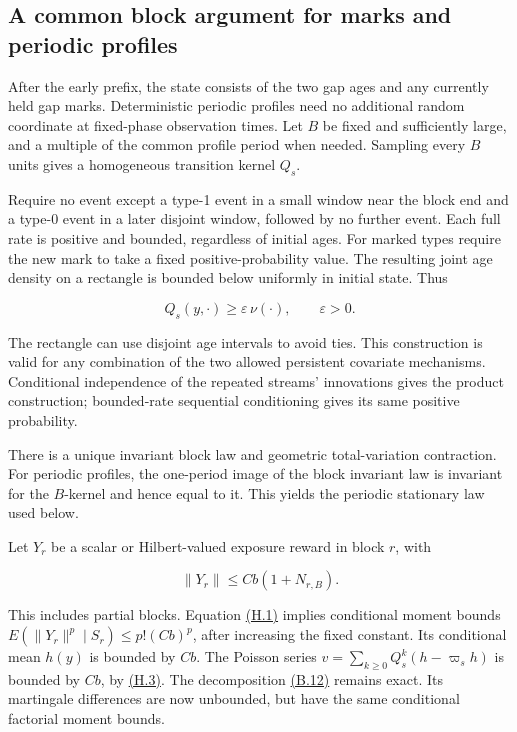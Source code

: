 \documentclass[11pt]{article}
\begin{document}
\subsection{A common block argument for marks and periodic profiles}\label{sec:H.2}

After the early prefix, the state consists of the two gap ages and any currently held gap marks. Deterministic periodic profiles need no additional random coordinate at fixed-phase observation times. Let \(B\) be fixed and sufficiently large, and a multiple of the common profile period when needed. Sampling every \(B\) units gives a homogeneous transition kernel \(Q_s\).

Require no event except a type-1 event in a small window near the block end and a type-0 event in a later disjoint window, followed by no further event. Each full rate is positive and bounded, regardless of initial ages. For marked types require the new mark to take a fixed positive-probability value. The resulting joint age density on a rectangle is bounded below uniformly in initial state. Thus

\begin{equation*}
Q_s(y,\cdot)\geq\varepsilon\,\nu(\cdot),
\qquad \varepsilon>0.
\tag{H.3}\label{eq:H.3}
\end{equation*}

The rectangle can use disjoint age intervals to avoid ties. This construction is valid for any combination of the two allowed persistent covariate mechanisms. Conditional independence of the repeated streams' innovations gives the product construction; bounded-rate sequential conditioning gives its same positive probability.

There is a unique invariant block law and geometric total-variation contraction. For periodic profiles, the one-period image of the block invariant law is invariant for the \(B\)-kernel and hence equal to it. This yields the periodic stationary law used below.

Let \(Y_r\) be a scalar or Hilbert-valued exposure reward in block \(r\), with

\begin{equation*}
\|Y_r\|\leq Cb(1+N_{r,B}).
\tag{H.4}\label{eq:H.4}
\end{equation*}

This includes partial blocks. Equation \hyperref[eq:H.1]{(H.1)} implies conditional moment bounds \(E(\|Y_r\|^p\mid S_r)\leq p!(Cb)^p\), after increasing the fixed constant. Its conditional mean \(h(y)\) is bounded by \(Cb\). The Poisson series \(v=\sum_{k\geq0}Q_s^k(h-\varpi_s h)\) is bounded by \(Cb\), by \hyperref[eq:H.3]{(H.3)}. The decomposition \hyperref[eq:B.12]{(B.12)} remains exact. Its martingale differences are now unbounded, but have the same conditional factorial moment bounds.
\end{document}
